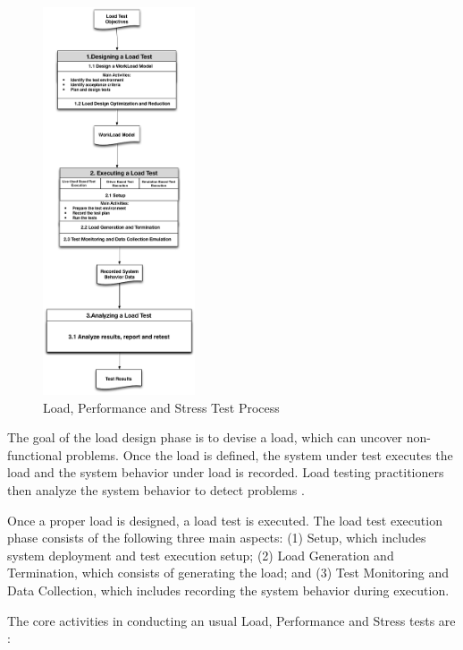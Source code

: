 \documentclass{report}
\begin{document}
\begin{figure}[!ht]
\centering
\includegraphics[width=0.4\textwidth]{./images/testprocess.png}
\caption{Load, Performance and Stress Test Process \cite{Jiang2010}\cite{Erinle2013}}
\label{fig:testprocess}
\end{figure}


The goal of the load design phase is to devise a load, which can uncover non-functional problems. Once the load is defined, the system under test executes the load and the system behavior under load is recorded. Load testing practitioners then analyze the system behavior to detect problems \cite{Jiang2010}.

Once a proper load is designed, a load test is executed. The load test execution phase consists of the following three main aspects: (1) Setup, which includes system deployment and test execution setup; (2) Load Generation and Termination, which consists of generating the load; and (3) Test Monitoring and Data Collection, which includes recording the system behavior during execution\cite{Jiang2010}.

The core activities in conducting an usual Load, Performance and Stress tests are \cite{Erinle2013}:
\end{document}
